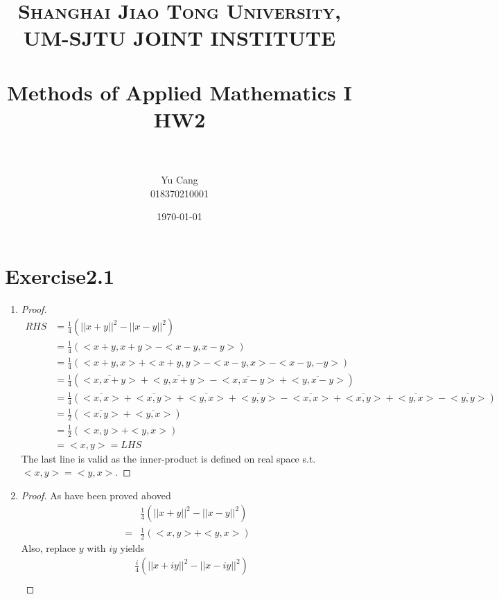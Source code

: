 \documentclass[paper=a4, fontsize=11pt]{scrartcl} %
\title{	
\normalfont \normalsize 
\textsc{Shanghai Jiao Tong University, UM-SJTU JOINT INSTITUTE} \\ [25pt] %
\horrule{0.5pt} \\[0.4cm] %
\huge Methods of Applied Mathematics I\\ HW2 \\ %
\horrule{2pt} \\[0.5cm] %
}
\author{Yu Cang \\ 018370210001} %
\date{\normalsize \today} %
\numberwithin{equation}{section} %
\numberwithin{figure}{section} %
\numberwithin{table}{section} %
\begin{document}
\maketitle %

\section{Exercise2.1}
	\begin{enumerate}
		\item 
			\begin{proof}
				\begin{equation}
					\begin{aligned}
						RHS & = \frac{1}{4} (||x+y||^2  - ||x-y||^2)\\
						    & = \frac{1}{4} (<x+y, x+y> - <x-y, x-y>)\\
						    & = \frac{1}{4} (<x+y, x> + <x+y, y> - <x-y, x> - <x-y, -y>)\\
						    & = \frac{1}{4} (\overline{<x, x+y>} + \overline{<y, x+y>} - \overline{<x, x-y>} + \overline{<y, x-y>})\\
						    & = \frac{1}{4} (\overline{<x, x>} + \overline{<x, y>} + \overline{<y, x>} + \overline{<y, y>} - \overline{<x, x>} + \overline{<x, y>} + \overline{<y, x>} - \overline{<y, y>})\\
						    & = \frac{1}{2}(\overline{<x,y>} + \overline{<y, x>})\\
						    & = \frac{1}{2}(<x, y> + <y, x>)\\
						    & = <x, y> = LHS
					\end{aligned}
				\end{equation}
				The last line is valid as the inner-product is defined on real space s.t. $<x, y>=<y, x>$.
			\end{proof}
		\item 
			\begin{proof}
				As have been proved aboved
				\begin{equation}
					\begin{aligned}
						   & \frac{1}{4} (||x+y||^2  - ||x-y||^2)\\
						=  & \frac{1}{2}(<x, y> + <y, x>)
					\end{aligned}
				\end{equation}
				Also, replace $y$ with $iy$ yields
				\begin{equation}
					\begin{aligned}
						  & \frac{i}{4} (||x+iy||^2  - ||x-iy||^2)\\

\end{aligned}
\end{equation}
\end{proof}
\end{enumerate}
\end{document}
